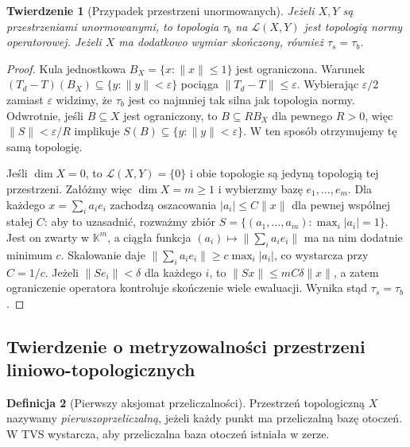 \documentclass[11pt,a4paper]{article}
\numberwithin{equation}{section}
\theoremstyle{plain}
\newtheorem{twierdzenie}{Twierdzenie}[section]
\theoremstyle{definition}
\newtheorem{definicja}[twierdzenie]{Definicja}
\theoremstyle{remark}
\newcommand{\K}{\mathbb K}
\begin{document}
\begin{twierdzenie}[Przypadek przestrzeni unormowanych]
\label{thm:op-b-norm}
Jeżeli $X,Y$ są przestrzeniami unormowanymi, to topologia
$\tau_b$ na $\mathcal L(X,Y)$ jest topologią normy
operatorowej. Jeżeli $X$ ma dodatkowo wymiar skończony,
również $\tau_s=\tau_b$.
\end{twierdzenie}
\begin{proof}
Kula jednostkowa $B_X=\{x:\|x\|\le1\}$ jest ograniczona.
Warunek $(T_d-T)(B_X)\subseteq\{y:\|y\|<\varepsilon\}$
pociąga $\|T_d-T\|\le\varepsilon$. Wybierając $\varepsilon/2$ zamiast $\varepsilon$ widzimy, że $\tau_b$ jest co najmniej tak silna jak topologia normy. Odwrotnie, jeśli
$B\subseteq X$ jest ograniczony, to
$B\subseteq RB_X$ dla pewnego $R>0$, więc
$\|S\|<\varepsilon/R$ implikuje $S(B)\subseteq
\{y:\|y\|<\varepsilon\}$. W ten sposób otrzymujemy
tę samą topologię.

Jeśli $\dim X=0$, to $\mathcal L(X,Y)=\{0\}$
i obie topologie są jedyną topologią tej przestrzeni.
Załóżmy więc $\dim X=m\geq1$ i wybierzmy bazę
$e_1,\ldots,e_m$. Dla każdego $x=\sum_i a_ie_i$
zachodzą oszacowania
$|a_i|\le C\|x\|$ dla pewnej wspólnej stałej $C$:
aby to uzasadnić, rozważmy zbiór
$S=\{(a_1,\ldots,a_m):\max_i|a_i|=1\}$.
Jest on zwarty w $\K^m$, a ciągła funkcja
$(a_i)\mapsto\|\sum_i a_ie_i\|$ ma na nim dodatnie
minimum $c$. Skalowanie daje
$\|\sum_i a_ie_i\|\ge c\max_i|a_i|$, co
wystarcza przy $C=1/c$.
Jeżeli $\|S e_i\|<\delta$ dla każdego $i$, to
$\|Sx\|\le mC\delta\|x\|$, a zatem ograniczenie
operatora kontroluje skończenie wiele ewaluacji.
Wynika stąd $\tau_s=\tau_b$.
\end{proof}

\subsection{Twierdzenie o metryzowalności przestrzeni liniowo-topologicznych}

\begin{definicja}[Pierwszy aksjomat przeliczalności]
Przestrzeń topologiczną $X$ nazywamy
\emph{pierwszoprzeliczalną}, jeżeli każdy punkt ma
przeliczalną bazę otoczeń. W TVS wystarcza, aby
przeliczalna baza otoczeń istniała w zerze.
\end{definicja}
\end{document}
